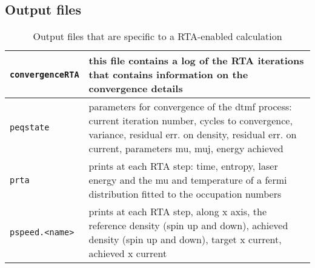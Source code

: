 \documentclass[11pt,a4paper]{article}
\begin{document}
		\subsection{Output files}
			\begin{table}[t]
				\caption{Output files that are specific to a RTA-enabled calculation}\label{tab:dynamic-output-files-rta}
				\begin{tabular}{|p{4.5cm}|p{10.2cm}|}
					\hline
					\texttt{convergenceRTA} & this file contains a log of the RTA iterations that contains information on the convergence details\\
					\hline
					\texttt{peqstate} &  parameters for convergence of the dtmf process: current iteration number, cycles to convergence, variance, residual err. on density, residual err. on current, parameters mu, muj, energy achieved\\
					\hline
					\texttt{prta} & prints at each RTA  step: time, entropy, laser energy and the mu and temperature of a fermi distribution fitted to the occupation numbers\\
					\hline
					\texttt{pspeed.<name>} & prints at each RTA step, along x axis, the reference density (spin up and down), achieved density (spin up and down), target x current, achieved x current \\
					\hline
				\end{tabular}
			\end{table}
			
			
			
								
	
\end{document}
